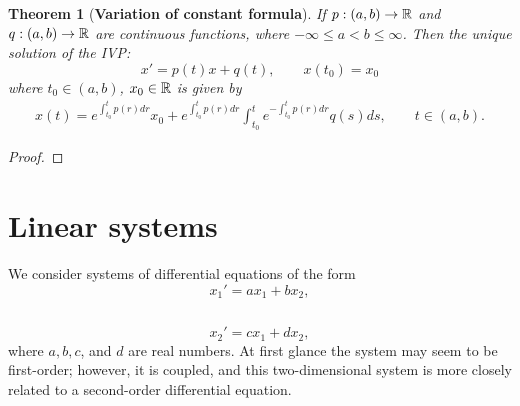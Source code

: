 \documentclass[leqno,DIV=calc,paper=a4,fontsize=11pt]{article}
\newtheorem{thm}{Theorem}[section]
\theoremstyle{definition}
\theoremstyle{plain}
\theoremstyle{remark}
\begin{document}
\begin{thm}[\textbf{Variation of constant formula}]
If $p:(a,b)\to\Bbb R$ and $q:(a,b)\to \Bbb R$ are continuous functions, where $-\infty\leq a<b\leq \infty$. Then the unique solution of the IVP:
\[x'=p(t)x+q(t),\qquad x(t_0)=x_0\]
where $t_0\in (a,b)$, $x_0\in \Bbb R$ is given by
\begin{align}
x(t)=e^{\int_{t_0}^{t}p(r)dr}x_0+e^{\int_{t_0}^{t}p(r)dr}\int_{t_0}^{t}e^{-\int_{t_0}^{t}p(r)dr}q(s)ds,\qquad t\in (a,b).
\end{align}
\end{thm}

\begin{proof}

\end{proof}
\section{Linear systems}
We consider systems of differential equations of the form
\[
x_1'=ax_1+bx_2,
\]

\vspace*{-.35in}
\begin{equation}
\label{twosys}
\end{equation}

\vspace*{-.35in}
\[
x_2'=cx_1+dx_2,
\]
where $a,b,c$, and $d$ are real numbers. At first glance the system
may seem to be first-order; however, it is coupled, and this
two-dimensional system is more closely related to a second-order
differential equation.
\end{document}

